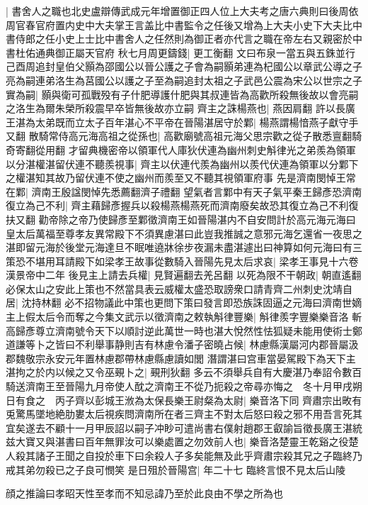 |{
	書舍人之職也北史盧辯傳武成元年增置御正四人位上大夫考之唐六典則曰後周依周官春官府置内史中大夫掌王言盖比中書監令之任後又增為上大夫小史下大夫比中書侍郎之任小史上士比中書舍人之任然則為御正者亦代言之職在帝左右又親密於中書杜佑通典御正屬天官府}
秋七月周更鑄錢|{
	更工衡翻}
文曰布泉一當五與五銖並行　己酉周追封皇伯父顥為邵國公以晉公護之子會為嗣顥弟連為杞國公以章武公導之子亮為嗣連弟洛生為莒國公以護之子至為嗣追封太祖之子武邑公震為宋公以世宗之子實為嗣|{
	顥與衛可孤戰殁有子什肥導護什肥與其叔連皆為高歡所殺無後故以會亮嗣之洛生為爾朱榮所殺震早卒皆無後故亦立嗣}
齊主之誅楊燕也|{
	燕因肩翻}
許以長廣王湛為太弟既而立太子百年湛心不平帝在晉陽湛居守於鄴|{
	楊燕謂楊愔燕子獻守手又翻}
散騎常侍高元海高祖之從孫也|{
	高歡廟號高祖元海父思宗歡之從子散悉亶翻騎奇寄翻從用翻}
才留典機密帝以領軍代人庫狄伏連為幽州刺史斛律光之弟羨為領軍以分湛權湛留伏連不聽羨視事|{
	齊主以伏連代羨為幽州以羨代伏連為領軍以分鄴下之權湛知其故乃留伏連不使之幽州而羨至又不聽其視領軍府事}
先是濟南閔悼王常在鄴|{
	濟南王殷諡閔悼先悉薦翻濟子禮翻}
望氣者言鄴中有天子氣平秦王歸彥恐濟南復立為己不利|{
	齊主藉歸彥握兵以殺楊燕楊燕死而濟南廢矣故恐其復立為己不利復扶又翻}
勸帝除之帝乃使歸彥至鄴徵濟南王如晉陽湛内不自安問計於高元海元海曰皇太后萬福至尊孝友異常殿下不須異慮湛曰此豈我推誠之意邪元海乞還省一夜思之湛即留元海於後堂元海達旦不眠唯遶牀徐步夜漏未盡湛遽出曰神算如何元海曰有三策恐不堪用耳請殿下如梁孝王故事從數騎入晉陽先見太后求哀|{
	梁孝王事見十六卷漢景帝中二年}
後見主上請去兵權|{
	見賢遍翻去羌呂翻}
以死為限不干朝政|{
	朝直遙翻}
必保太山之安此上策也不然當具表云威權太盛恐取謗衆口請青齊二州刺史沈靖自居|{
	沈持林翻}
必不招物議此中策也更問下策曰發言即恐族誅固逼之元海曰濟南世嫡主上假太后令而奪之今集文武示以徵濟南之敕執斛律豐樂|{
	斛律羨字豐樂樂音洛}
斬高歸彥尊立濟南號令天下以順討逆此萬世一時也湛大悅然性怯狐疑未能用使術士鄭道謙等卜之皆曰不利舉事静則吉有林慮令潘子密曉占候|{
	林慮縣漢屬河内郡晉屬汲郡魏敬宗永安元年置林慮郡帶林慮縣慮讀如閭}
潛謂湛曰宫車當晏駕殿下為天下主湛拘之於内以候之又令巫覡卜之|{
	覡刑狄翻}
多云不須舉兵自有大慶湛乃奉詔令數百騎送濟南王至晉陽九月帝使人酖之濟南王不從乃扼殺之帝尋亦悔之　冬十月甲戌朔日有食之　丙子齊以彭城王浟為太保長樂王尉粲為太尉|{
	樂音洛下同}
齊肅宗出畋有兎驚馬墜地絶肋婁太后視疾問濟南所在者三齊主不對太后怒曰殺之邪不用吾言死其宜矣遂去不顧十一月甲辰詔以嗣子冲眇可遣尚書右僕射趙郡王叡諭旨徵長廣王湛統兹大寶又與湛書曰百年無罪汝可以樂處置之勿效前人也|{
	樂音洛楚靈王乾谿之役楚人殺其諸子王聞之自投於車下曰余殺人子多矣能無及此乎齊肅宗殺其兄之子臨終乃戒其弟勿殺已之子良可憫笑}
是日殂於晉陽宫|{
	年二十七}
臨終言恨不見太后山陵

顔之推論曰孝昭天性至孝而不知忌諱乃至於此良由不學之所為也

